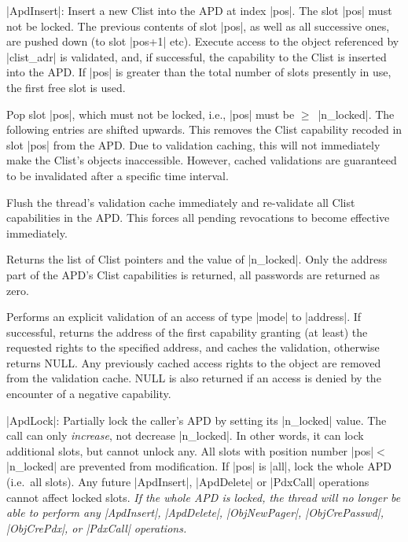 \documentclass[a4paper,11pt,twoside,dvips]{report}
\begin{document}
\begin{description}

\begin{sloppypar}
\item[|ApdInsert|:] Insert a new Clist into the APD at index
|pos|. The slot |pos| must not be locked.  The previous contents of slot
|pos|, as well as all successive ones, are pushed down (to slot |pos+1|
etc). Execute access to the object referenced by |clist\_adr| is validated,
and, if successful, the capability to the Clist is inserted into the
APD. If |pos| is greater than the total number of slots presently in
use, the first free slot is used.
\end{sloppypar}

\item[|ApdDelete|:] Pop slot |pos|, which must not be locked,
i.e., |pos| must be \(\geq\)~|n\_locked|. The following entries are
shifted upwards. This removes the Clist capability recoded in slot |pos|
from the APD. Due to validation caching, this will not
immediately make the Clist's objects inaccessible. However, cached
validations are guaranteed to be invalidated after a specific time
interval.

\item[|ApdFlush|:] Flush the thread's validation cache immediately and
re-validate all Clist capabilities in the APD. This forces all
pending revocations to become effective immediately.

\item[|ApdGet|:] Returns the list of Clist pointers and the
value of |n\_locked|. Only the address part of the APD's Clist
capabilities is returned, all passwords are returned as zero.

\item[|ApdLookup|:] Performs an explicit validation of an access of type
|mode| to |address|. If successful, returns the address of
the first capability granting (at least) the requested rights to
the specified address, and caches the validation, otherwise returns
NULL. Any previously cached access rights to the object are removed from
the validation cache. NULL is also returned if an access is denied by the
encounter of a negative capability.

\begin{sloppypar}
\item[|ApdLock|:] Partially lock the caller's APD by setting
its |n\_locked| value. The call can only \emph{increase}, not decrease
|n\_locked|. In other words, it can lock additional slots, but cannot
unlock any. All slots with position number |pos|\(<\)|n\_locked| are
prevented from modification. If |pos| is |all|, lock the whole APD
(i.e.\ all slots). Any future |ApdInsert|, |ApdDelete| or |PdxCall|
operations cannot affect locked slots. \emph{If the whole APD is locked,
the thread will no longer be able to perform any |ApdInsert|, |ApdDelete|,
|ObjNewPager|, |ObjCrePasswd|, |ObjCrePdx|, or |PdxCall| operations.}


\end{sloppypar}
\end{description}
\end{document}
